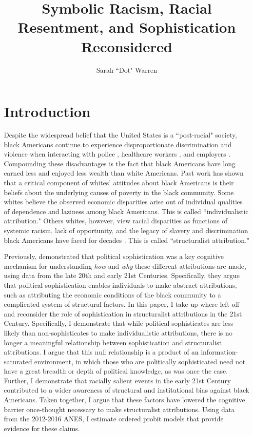 \documentclass[12pt]{paper}
\title{Symbolic Racism, Racial Resentment, and Sophistication Reconsidered}
\author{Sarah ``Dot" Warren}
\date{}
\begin{document}
\maketitle

\doublespacing
\section*{Introduction}
Despite the widespread belief that the United States is a ``post-racial" society, black Americans continue to experience disproportionate discrimination and violence when interacting with police \citep{knox_administrative_2020, zhao_note_2022}, healthcare workers \citep{flores_racial_2005, penner_reducing_2014}, and employers \citep{quillian_meta-analysis_2017, kang_whitened_2016}. Compounding these disadvantages is the fact that black Americans have long earned less and enjoyed less wealth \citep{shapiro_hidden_2004} than white Americans. Past work has shown that a critical component of whites' attitudes about black Americans is their beliefs about the underlying causes of poverty in the black community. Some whites believe the observed economic disparities arise out of individual qualities of dependence and laziness among black Americans. This is called ``individualistic attribution." Others whites, however, view racial disparities as functions of systemic racism, lack of opportunity, and the legacy of slavery and discrimination black Americans have faced for decades \citep{feagin_poverty_1972}.  This is called ``structuralist attribution."

Previously, \cite{gomez_rethinking_2006} demonstrated that political sophistication was a key cognitive mechanism for understanding \textit{how} and \textit{why} these different attributions are made, using data from the late 20th and early 21st Centuries. Specifically, they argue that political sophistication enables individuals to make abstract attributions, such as attributing the economic conditions of the black community to a complicated system of structural factors. In this paper, I take up where \cite{gomez_rethinking_2006} left off and reconsider the role of sophistication in structuralist attributions in the 21st Century. Specifically, I demonstrate that  while political sophisticates are less likely than non-sophisticates to make individualistic attributions, there is no longer a meaningful relationship between sophistication and structuralist attributions. I argue that this null relationship is a product of an information-saturated environment, in which those who are politically sophisticated need not have a great breadth or depth of political knowledge, as was once the case. Further, I demonstrate that racially salient events in the early 21st Century contributed to a wider awareness of structural and institutional bias against black Americans. Taken together, I argue that these factors have lowered the cognitive barrier once-thought necessary to make structuralist attributions. Using data from the 2012-2016 ANES, I estimate ordered probit models that provide evidence for these claims.
\end{document}
